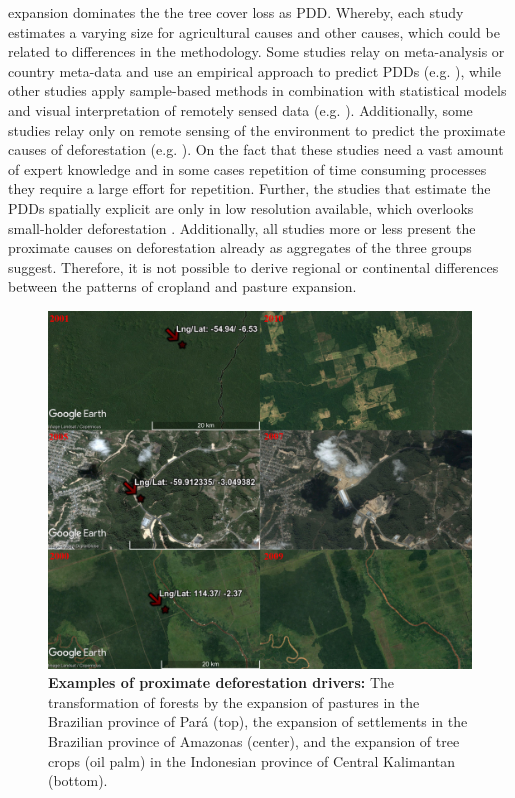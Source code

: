 expansion dominates the the tree cover loss as \ac{PDD}. Whereby, each study estimates a varying size for agricultural causes and other causes, which could be related to differences in the methodology. Some studies relay on meta-analysis or country meta-data and use an empirical approach to predict \acp{PDD} (e.g. \citet{Hosonuma2012,Geist2002,DeFries2010,Carter2018,Ruf2014}), while other studies apply sample-based methods in combination with statistical models and visual interpretation of remotely sensed data (e.g. \citet{Sy2015,Austin2019,Curtis2018,Meyfroidt2013,Caldas2013}). Additionally, some studies relay only on remote sensing of the environment to predict the proximate causes of deforestation (e.g. \citet{Caldas2013,Zalles2018,Graesser2015,Connette2016,Barima2016}). On the fact that these studies need a vast amount of expert knowledge and in some cases repetition of time consuming processes they require a large effort for repetition. Further, the studies that estimate the \acp{PDD} spatially explicit are only in low resolution available, which overlooks small-holder deforestation \citep{Curtis2018,Caldas2013}. Additionally, all studies more or less present the proximate causes on deforestation already as aggregates of the three groups \citeauthor{Geist2001} suggest. Therefore, it is not possible to derive regional or continental differences between the patterns of cropland and pasture expansion.
	\begin{figure}[ht]
		\centering
		\includegraphics[scale=0.6]{img/deforestation_examples}
		\caption[Examples of proximate deforestation drivers]{\textbf{Examples of proximate deforestation drivers:} The transformation of forests by the expansion of pastures in the Brazilian province of Pará (top), the expansion of settlements in the Brazilian province of Amazonas (center), and the expansion of tree crops (oil palm) in the Indonesian province of Central Kalimantan (bottom).}
		\label{fig:deforestationexamples}
	\end{figure}

